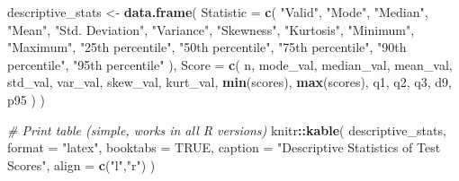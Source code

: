 \documentclass[
]{article}
\newenvironment{Shaded}{\begin{snugshade}}{\end{snugshade}}
\newcommand{\AttributeTok}[1]{\textcolor[rgb]{0.13,0.29,0.53}{#1}}
\newcommand{\CommentTok}[1]{\textcolor[rgb]{0.56,0.35,0.01}{\textit{#1}}}
\newcommand{\ConstantTok}[1]{\textcolor[rgb]{0.56,0.35,0.01}{#1}}
\newcommand{\FunctionTok}[1]{\textcolor[rgb]{0.13,0.29,0.53}{\textbf{#1}}}
\newcommand{\NormalTok}[1]{#1}
\newcommand{\OtherTok}[1]{\textcolor[rgb]{0.56,0.35,0.01}{#1}}
\newcommand{\SpecialCharTok}[1]{\textcolor[rgb]{0.81,0.36,0.00}{\textbf{#1}}}
\newcommand{\StringTok}[1]{\textcolor[rgb]{0.31,0.60,0.02}{#1}}
\begin{document}
\begin{Shaded}
\begin{Highlighting}[]
\NormalTok{descriptive\_stats }\OtherTok{\textless{}{-}} \FunctionTok{data.frame}\NormalTok{(}
  \AttributeTok{Statistic =} \FunctionTok{c}\NormalTok{(}
    \StringTok{"Valid"}\NormalTok{,}
    \StringTok{"Mode"}\NormalTok{,}
    \StringTok{"Median"}\NormalTok{,}
    \StringTok{"Mean"}\NormalTok{,}
    \StringTok{"Std. Deviation"}\NormalTok{,}
    \StringTok{"Variance"}\NormalTok{,}
    \StringTok{"Skewness"}\NormalTok{,}
    \StringTok{"Kurtosis"}\NormalTok{,}
    \StringTok{"Minimum"}\NormalTok{,}
    \StringTok{"Maximum"}\NormalTok{,}
    \StringTok{"25th percentile"}\NormalTok{,}
    \StringTok{"50th percentile"}\NormalTok{,}
    \StringTok{"75th percentile"}\NormalTok{,}
    \StringTok{"90th percentile"}\NormalTok{,}
    \StringTok{"95th percentile"}
\NormalTok{  ),}
  \AttributeTok{Score =} \FunctionTok{c}\NormalTok{(}
\NormalTok{    n,}
\NormalTok{    mode\_val,}
\NormalTok{    median\_val,}
\NormalTok{    mean\_val,}
\NormalTok{    std\_val,}
\NormalTok{    var\_val,}
\NormalTok{    skew\_val,}
\NormalTok{    kurt\_val,}
    \FunctionTok{min}\NormalTok{(scores),}
    \FunctionTok{max}\NormalTok{(scores),}
\NormalTok{    q1,}
\NormalTok{    q2,}
\NormalTok{    q3,}
\NormalTok{    d9,}
\NormalTok{    p95}
\NormalTok{  )}
\NormalTok{)}
\end{Highlighting}
\end{Shaded}

\begin{Shaded}
\begin{Highlighting}[]
\CommentTok{\# Print table (simple, works in all R versions)}
\NormalTok{knitr}\SpecialCharTok{::}\FunctionTok{kable}\NormalTok{(}
\NormalTok{  descriptive\_stats,}
  \AttributeTok{format =} \StringTok{"latex"}\NormalTok{,}
  \AttributeTok{booktabs =} \ConstantTok{TRUE}\NormalTok{,}
  \AttributeTok{caption =} \StringTok{"Descriptive Statistics of Test Scores"}\NormalTok{,}
  \AttributeTok{align =} \FunctionTok{c}\NormalTok{(}\StringTok{"l"}\NormalTok{,}\StringTok{"r"}\NormalTok{)}
\NormalTok{)}
\end{Highlighting}
\end{Shaded}
\end{document}

